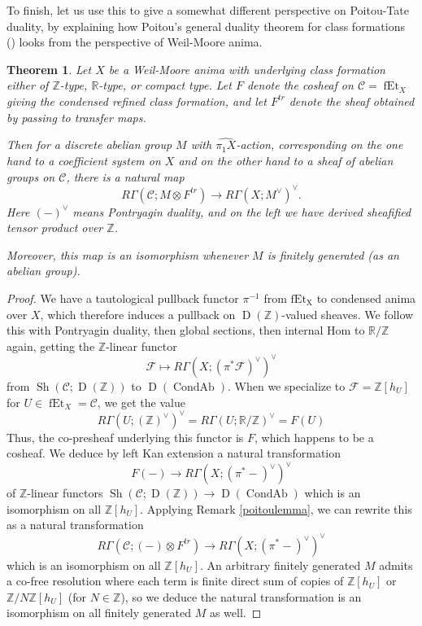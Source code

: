 \documentclass[12pt]{article}
\newtheorem{theorem}{Theorem}[section]
\theoremstyle{definition}
\newcommand{\on}{\operatorname}
\newcommand{\mc}{\mathcal}
\newcommand{\mbb}{\mathbb}
\newcommand{\wh}{\widehat}
\begin{document}
To finish, let us use this to give a somewhat different perspective on Poitou-Tate duality, by explaining how Poitou's general duality theorem for class formations (\cite{poitou}) looks from the perspective of Weil-Moore anima.

\begin{theorem}
Let $X$ be a Weil-Moore anima with underlying class formation either of $\mbb{Z}$-type, $\mbb{R}$-type, or compact type.  Let $F$ denote the cosheaf on $\mc{C}=\on{fEt}_X$ giving the condensed refined class formation, and let $F^{tr}$ denote the sheaf obtained by passing to transfer maps.

Then for a discrete abelian group $M$ with $\wh{\pi_1X}$-action, corresponding on the one hand to a coefficient system on $X$ and on the other hand to a sheaf of abelian groups on $\mc{C}$, there is a natural map
$$R\Gamma(\mc{C};M\otimes F^{tr})\to R\Gamma(X;M^\vee)^\vee.$$
Here $(-)^\vee$ means Pontryagin duality, and on the left we have derived sheafified tensor product over $\mbb{Z}$.

Moreover, this map is an isomorphism whenever $M$ is finitely generated (as an abelian group).
\end{theorem}
\begin{proof}
We have a tautological pullback functor $\pi^{-1}$ from $\on{fEt_X}$ to condensed anima over $X$, which therefore induces a pullback on $\on{D}(\mbb{Z})$-valued sheaves.  We follow this with Pontryagin duality, then global sections, then internal Hom to $\mbb{R}/\mbb{Z}$ again, getting the $\mbb{Z}$-linear functor
$$\mc{F} \mapsto R\Gamma(X;(\pi^\ast\mc{F})^\vee)^\vee$$
from $\on{Sh}(\mc{C};\on{D}(\mbb{Z}))$ to $\on{D}(\on{CondAb})$.  When we specialize to $\mc{F}=\mbb{Z}[h_U]$ for $U\in\on{fEt}_X=\mc{C}$, we get the value
$$R\Gamma(U;(\mbb{Z})^\vee)^\vee = R\Gamma(U;\mbb{R}/\mbb{Z})^\vee = F(U)$$
Thus, the co-presheaf underlying this functor is $F$, which happens to be a cosheaf.  We deduce by left Kan extension a natural transformation
$$F(-) \to R\Gamma(X;(\pi^\ast-)^\vee)^\vee$$
of $\mbb{Z}$-linear functors $\on{Sh}(\mc{C};\on{D}(\mbb{Z}))\to\on{D}(\on{CondAb})$ which is an isomorphism on all $\mbb{Z}[h_U]$.  Applying Remark \ref{poitoulemma}, we can rewrite this as a natural transformation
$$R\Gamma(\mc{C};(-)\otimes F^{tr}) \to R\Gamma(X;(\pi^\ast-)^\vee)^\vee$$
which is an isomorphism on all $\mbb{Z}[h_U]$.  An arbitrary finitely generated $M$ admits a co-free resolution where each term is finite direct sum of copies of $\mbb{Z}[h_U]$ or $\mbb{Z}/N\mbb{Z}[h_U]$ (for $N\in\mbb{Z}$), so we deduce the natural transformation is an isomorphism on all finitely generated $M$ as well.
\end{proof}
\end{document}
